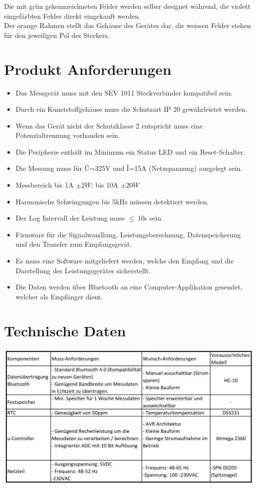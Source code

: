 \documentclass[12pt,a4paper]{article}
\begin{document}
Die mit grün gekennzeichneten Felder werden selber designet während, die violett eingefärbten Felder direkt eingekauft werden.\\
Der orange Rahmen stellt das Gehäuse des Gerätes dar, die weissen Felder stehen für den jeweiligen Pol des Steckers.

\newpage
\section{Produkt Anforderungen}
\begin{itemize}
\item Das Messgerät muss mit den SEV 1011 Steckverbinder kompatibel sein.
\item Durch ein Kunststoffgehäuse muss die Schutzart IP 20 gewährleistet werden.
\item Wenn das Gerät nicht der Schutzklasse 2 entspricht muss eine Potenzialtrennung vorhanden sein.
\item Die Peripherie enthält im Minimum ein Status LED und ein Reset-Schalter.
\item Die Messung muss für Û=325V und Î=15A (Netzspannung) ausgelegt sein.
\item Messbereich bis 1A $\pm2W$; bis 10A $\pm 20W$
\item Harmonische Schwingungen bis 5kHz müssen detektiert werden.
\item Der Log Intervall der Leistung muss $\leq \ $10s sein.

\item Firmware für die Signalwandlung, Leistungsberechnung, Datenspeicherung und den Transfer zum Empfangsgerät.
\item Es muss eine Software mitgeliefert werden, welche den Empfang und die Darstellung des Leistungsgerätes sicherstellt. 

\item Die Daten werden über Bluetooth an eine Computer-Applikation gesendet, welcher als Empfänger dient. 
\end{itemize}


\section{Technische Daten}

 \includegraphics[scale=0.45]{Komp-1.png}
\end{document}
